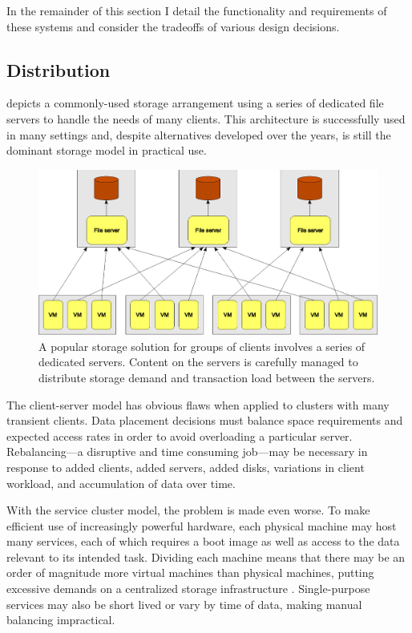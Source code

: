 In the remainder of this section I detail the functionality and requirements of these systems and consider the tradeoffs of various design decisions.

\subsection{Distribution}

 depicts a commonly-used storage arrangement using a series of dedicated file servers to handle the needs of many clients. This architecture is successfully used in many settings and, despite alternatives developed over the years, is still the dominant storage model in practical use.

\begin{figure}[tp]
\centering
\includegraphics[width=.8\textwidth]{figures/client-server}
\caption[Machines served by a series of client-server file systems]{A popular storage solution for groups of clients involves a series of dedicated servers. Content on the servers is carefully managed to distribute storage demand and transaction load between the servers.}
\label{fig:client-server}
\end{figure}

The client-server model has obvious flaws when applied to clusters with many transient clients. Data placement decisions must balance space requirements and expected access rates in order to avoid overloading a particular server. Rebalancing---a disruptive and time consuming job---may be necessary in response to added clients, added servers, added disks, variations in client workload, and accumulation of data over time.

With the service cluster model, the problem is made even worse. To make efficient use of increasingly powerful hardware, each physical machine may host many services, each of which requires a boot image as well as access to the data relevant to its intended task. Dividing each machine means that there may be an order of magnitude more virtual machines than physical machines, putting excessive demands on a centralized storage infrastructure \cite{hospodor}. Single-purpose services may also be short lived or vary by time of data, making manual balancing impractical.


